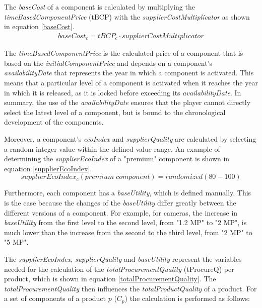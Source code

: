 The \textit{baseCost} of a component is calculated by multiplying the \textit{timeBasedComponentPrice} (\gls{tBCP}) with the \textit{supplierCostMultiplicator} as shown in equation \ref{baseCost}.
\begin{equation}
\label{baseCost}
\begin{aligned}
   baseCost_{c} = tBCP_{c} \cdot supplierCostMultiplicator
\end{aligned}    
\end{equation}

The \textit{timeBasedComponentPrice} is the calculated price of a component that is based on the \textit{initialComponentPrice} and depends on a component's \textit{availabilityDate} that represents the year in which a component is activated. This means that a particular level of a component is activated when it reaches the year in which it is released, as it is locked before exceeding its \textit{availabilityDate}. In summary, the use of the \textit{availabilityDate} ensures that the player cannot directly select the latest level of a component, but is bound to the chronological development of the components.

Moreover, a component's \textit{ecoIndex} and \textit{supplierQuality} are calculated by selecting a random integer value within the defined value range. An example of determining the \textit{supplierEcoIndex} of a "premium" component is shown in equation \ref{supplierEcoIndex}.
\begin{equation}
\label{supplierEcoIndex}
    supplierEcoIndex_{c}(premium \; component) = randomized(80-100)
\end{equation}

Furthermore, each component has a \textit{baseUtility}, which is defined manually. This is the case because the changes of the \textit{baseUtility} differ greatly between the different versions of a component. For example, for cameras, the increase in \textit{baseUtility} from the first level to the second level, from "1.2 MP" to "2 MP", is much lower than the increase from the second to the third level, from "2 MP" to "5 MP".

The \textit{supplierEcoIndex}, \textit{supplierQuality} and \textit{baseUtility} represent the variables needed for the calculation of the \textit{totalProcurementQuality} (\gls{tProcureQ}) per product, which is shown in equation \ref{totalProcurementQuality}. The \textit{totalProcurementQuality} then influences the \textit{totalProductQuality} of a product. For a set of components of a product $p$ ($C_p$) the calculation is performed as follows:

